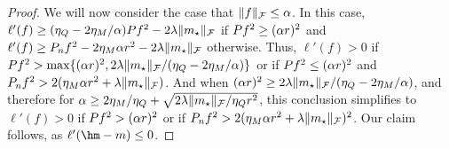 \begin{proof}
We will now consider the case that $\lVert f\rVert_{\mathcal{F}} \le \alpha$. In this case,
$\ell'(f) \ge (\eta_Q - 2\eta_M/\alpha) \P f^2 -  2 \lambda \norm{m_{\star}}_{\F}$ if $\P f^2 \ge (\alpha r)^2$
and $\ell'(f) \ge \Pn  f^2 - 2\eta_M\alpha r^2 - 2 \lambda \norm{m_{\star}}_{\F}$ otherwise. 
Thus, $\ell'(f) > 0$ if $\P f^2 > \max\set{(\alpha r)^2, 2 \lambda \norm{m_{\star}}_{\F}/(\eta_Q - 2\eta_M/\alpha)}$
or if $\P f^2 \le (\alpha r)^2$ and $\Pn f^2 > 2(\eta_M \alpha r^2 + \lambda \norm{m_{\star}}_{\F})$.
And when $(\alpha r)^2 \ge 2 \lambda \lVert m_{\star}\rVert_{\mathcal{F}}/(\eta_Q - 2\eta_M/\alpha)$, 
and therefore for $\alpha \ge 2\eta_M/\eta_Q + \sqrt{2\lambda \lVert m_{\star}\rVert_{\mathcal{F}}/\eta_Q r^2}$,
this conclusion simplifies to $\ell'(f) > 0$ if $\P f^2 > (\alpha r)^2$
or if $\Pn f^2 > 2(\eta_M \alpha r^2 + \lambda \norm{m_{\star}}_{\F})^2$.
Our claim follows, as $\ell'(\hm-m) \le 0$.
\end{proof}

